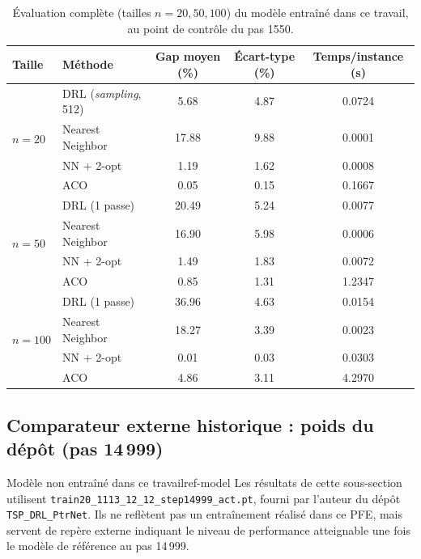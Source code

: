 \documentclass[12pt, a4paper, twoside, openright]{book}
\begin{document}
\begin{table}[H]
	\centering
	\begin{tabular}{llccc}
		\toprule
		Taille & Méthode & Gap moyen (\%) & Écart-type (\%) & Temps/instance (s) \\
		\midrule
		\multirow{4}{*}{$n=20$}
		& DRL (\textit{sampling}, 512) & 5.68  & 4.87 & 0.0724 \\
		& Nearest Neighbor             & 17.88 & 9.88 & 0.0001 \\
		& NN + 2-opt                   & 1.19  & 1.62 & 0.0008 \\
		& ACO                          & 0.05  & 0.15 & 0.1667 \\
		\midrule
		\multirow{4}{*}{$n=50$}
		& DRL (1 passe)     & 20.49 & 5.24 & 0.0077 \\
		& Nearest Neighbor  & 16.90 & 5.98 & 0.0006 \\
		& NN + 2-opt        & 1.49  & 1.83 & 0.0072 \\
		& ACO               & 0.85  & 1.31 & 1.2347 \\
		\midrule
		\multirow{4}{*}{$n=100$}
		& DRL (1 passe)     & 36.96 & 4.63 & 0.0154 \\
		& Nearest Neighbor  & 18.27 & 3.39 & 0.0023 \\
		& NN + 2-opt        & 0.01  & 0.03 & 0.0303 \\
		& ACO               & 4.86  & 3.11 & 4.2970 \\
		\bottomrule
	\end{tabular}
	\caption{Évaluation complète (tailles $n=20, 50, 100$) du modèle entraîné dans ce travail, au point de contrôle du pas 1550.}
	\label{tab:resultats-step1550}
\end{table}

\subsection[Comparateur externe historique : poids du dépôt (pas 14 999)]{Comparateur externe historique : poids du dépôt (pas 14\,999)}
\label{sec:res-pretrained}

\begin{remark}{Modèle non entraîné dans ce travail}{ref-model}
	Les résultats de cette sous-section utilisent
	\texttt{train20\_1113\_12\_12\_step14999\_act.pt}, fourni par l'auteur du
	dépôt \texttt{TSP\_DRL\_PtrNet}. Ils ne reflètent pas un entraînement
	réalisé dans ce PFE, mais servent de repère externe indiquant le niveau de
	performance atteignable une fois le modèle de référence au pas 14\,999.
\end{remark}
\end{document}
